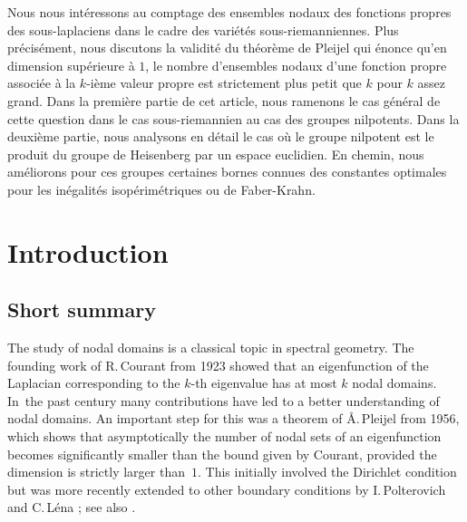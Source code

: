\documentclass[JEP,XML,SOM,Unicode,published]{cedram}
\theoremstyle{definition}
\newcommand{\1}{\mathbbm{1}}
\begin{document}


\begin{altabstract}
Nous nous intéressons au comptage des ensembles nodaux des fonctions propres des sous-laplaciens dans le cadre des variétés sous-riemanniennes. Plus précisément, nous discutons la validité du théorème de Pleijel qui énonce qu'en dimension supérieure à $1$, le nombre d'ensembles nodaux d'une fonction propre associée à la $k$-ième valeur propre est strictement plus petit que $k$ pour $k$ assez grand.
Dans la première partie de cet article, nous ramenons le cas général de cette question dans le cas sous-riemannien au cas des groupes nilpotents.
Dans la deuxième partie, nous analysons en détail le cas où le groupe nilpotent est le produit du groupe de Heisenberg par un espace euclidien. En chemin, nous améliorons pour ces groupes certaines bornes connues des constantes optimales pour les inégalités isopérimétriques ou de Faber-Krahn.
\end{altabstract}

\maketitle
\vspace*{-\baselineskip}
\tableofcontents


\vspace*{-3\baselineskip}
\mbox{}
\section{Introduction}\label{s0}

\subsection{Short summary}
The study of nodal domains is a classical topic in spectral geometry. The founding work of R.\,Courant \cite{CH} from 1923 showed that an eigenfunction of the Laplacian corresponding to the $k$-th eigenvalue has at most $k$ nodal domains. In~the past century many contributions have led to a better understanding of nodal domains. An important step for this was a theorem of \AA.\,Pleijel \cite{Pl} from 1956, which shows that asymptotically the number of nodal sets of an eigenfunction becomes significantly smaller than the bound given by Courant, provided the dimension is strictly larger than~$1$. This initially involved the Dirichlet condition but was more recently extended to other boundary conditions by I.\,Polterovich \cite{Po} and C.\,Léna \cite{Le}; see also \cite{DFV}.
\end{document}
